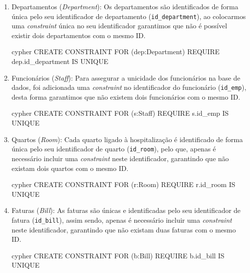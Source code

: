 \begin{enumerate}
    \begin{myminted}{cypher}
    CREATE CONSTRAINT FOR (m:MedicalHistory) REQUIRE m.id_record IS UNIQUE
    \end{myminted}
    
    \item Departamentos (\textit{Department}): Os departamentos são identificados de forma única pelo seu identificador de departamento (\texttt{id\_department}), ao colocarmos uma \textit{constraint} única no seu identificador garantimos que não é possível existir dois departamentos com o mesmo ID.
    
    \begin{myminted}{cypher}
    CREATE CONSTRAINT FOR (dep:Department) REQUIRE dep.id_department IS UNIQUE
    \end{myminted}

    \item Funcionários (\textit{Staff}): Para assegurar a unicidade dos funcionários na base de dados, foi adicionada uma \textit{constraint} no identificador do funcionário (\texttt{id\_emp}), desta forma garantimos que não existem dois funcionários com o mesmo ID.

    \begin{myminted}{cypher}
    CREATE CONSTRAINT FOR (s:Staff) REQUIRE s.id_emp IS UNIQUE
    \end{myminted}
    
    \item Quartos (\textit{Room}): Cada quarto ligado à hospitalização é identificado de forma única pelo seu identificador de quarto (\texttt{id\_room}), pelo que, apenas é necessário incluir uma \textit{constraint} neste identificador, garantindo que não existam dois quartos com o mesmo ID.

    \begin{myminted}{cypher}
    CREATE CONSTRAINT FOR (r:Room) REQUIRE r.id_room IS UNIQUE
    \end{myminted}
    
    \item Faturas (\textit{Bill}): As faturas são únicas e identificadas pelo seu identificador de fatura (\texttt{id\_bill}), assim sendo, apenas é necessário incluir uma \textit{constraint} neste identificador, garantindo que não existam duas faturas com o mesmo ID.
    
    \begin{myminted}{cypher}
    CREATE CONSTRAINT FOR (b:Bill) REQUIRE b.id_bill IS UNIQUE
    \end{myminted}
    

\end{enumerate}
